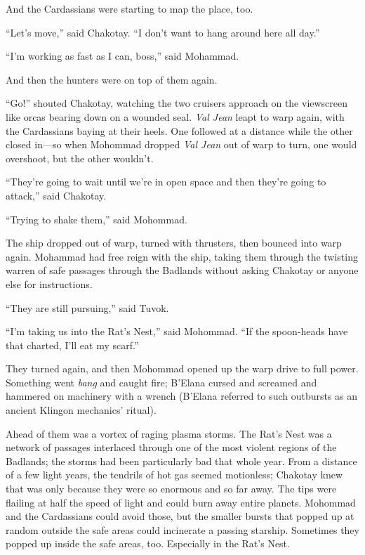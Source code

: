 \documentclass[twoside,letterpaper,12pt]{memoir}
\begin{document}
And the Cardassians were starting to map the place, too.

``Let's move,'' said Chakotay. ``I don't want to hang around here all day.''

``I'm working as fast as I can, boss,'' said Mohammad.

And then the hunters were on top of them again.

``Go!'' shouted Chakotay, watching the two cruisers approach on the viewscreen like orcas bearing down on a wounded seal. \textit{Val Jean} leapt to warp again, with the Cardassians baying at their heels. One followed at a distance while the other closed in---so when Mohommad dropped \textit{Val Jean} out of warp to turn, one would overshoot, but the other wouldn't.

``They're going to wait until we're in open space and then they're going to attack,'' said Chakotay.

``Trying to shake them,'' said Mohommad.

The ship dropped out of warp, turned with thrusters, then bounced into warp again. Mohammad had free reign with the ship, taking them through the twisting warren of safe passages through the Badlands without asking Chakotay or anyone else for instructions.

``They are still pursuing,'' said Tuvok.

``I'm taking us into the Rat's Nest,'' said Mohommad. ``If the spoon-heads have that charted, I'll eat my scarf.''

They turned again, and then Mohommad opened up the warp drive to full power. Something went \textit{bang} and caught fire; B'Elana cursed and screamed and hammered on machinery with a wrench (B'Elana referred to such outbursts as an ancient Klingon mechanics' ritual).

Ahead of them was a vortex of raging plasma storms. The Rat's Nest was a network of passages interlaced through one of the most violent regions of the Badlands; the storms had been particularly bad that whole year. From a distance of a few light years, the tendrils of hot gas seemed motionless; Chakotay knew that was only because they were so enormous and so far away. The tips were flailing at half the speed of light and could burn away entire planets. Mohommad and the Cardassians could avoid those, but the smaller bursts that popped up at random outside the safe areas could incinerate a passing starship. Sometimes they popped up inside the safe areas, too. Especially in the Rat's Nest.
\end{document}
